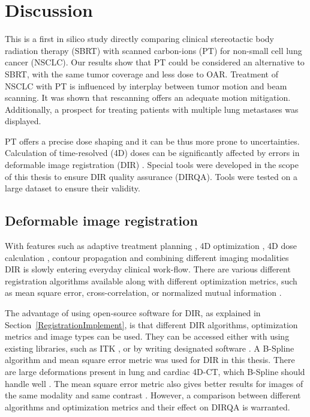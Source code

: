 \documentclass[type=dr, dr=rernat, accentcolor=tud7b,colorbacktitle, bigchapter, openright, twoside, 12pt ]{tudthesis}
\begin{document}
\chapter{Discussion}

This is a first in silico study directly comparing clinical stereotactic body radiation therapy (SBRT) with scanned carbon-ions (PT) for non-small cell lung cancer (NSCLC). 
Our results show that PT could be considered an alternative to SBRT, with the same tumor coverage and less dose to OAR. Treatment of NSCLC with PT is influenced by 
interplay between tumor motion and beam scanning. It was shown that rescanning offers an
adequate motion mitigation. Additionally, a prospect for treating patients with multiple lung metastases was displayed.

PT offers a precise dose shaping and it can be thus more prone to uncertainties. Calculation of time-resolved (4D) doses can be significantly
affected by errors in deformable image registration (DIR) \cite{Heath2006}. Special tools were developed in the scope of this thesis to ensure DIR quality assurance (DIRQA).
Tools were tested on a large dataset to ensure their validity.


\section{Deformable image registration}

With features such as adaptive treatment planning \cite{Yan1997}, 4D optimization \cite{Trofimov2005}, 4D dose calculation \cite{Flampouri2006}, 
contour propagation \cite{Lu2006b} and combining different imaging modalities \cite{Leibfarth2013} DIR is slowly entering everyday clinical work-flow. 
There are various different registration algorithms available \cite{Varadhan2013}
along with different optimization metrics, such as mean square error, cross-correlation, or normalized mutual information \cite{Glocker2011}.

The advantage of using open-source software for DIR, as explained in Section~\ref{RegistrationImplement}, is that different DIR algorithms, 
optimization metrics and image types can be used. They can be accessed either with using
existing libraries, such as ITK \cite{Yoo2002}, or by writing designated software \cite{Fedorov2015}. A B-Spline algorithm and mean square error metric was used for DIR in this thesis. 
There are large deformations present in lung and cardiac
4D-CT, which B-Spline should handle well \cite{Tang2013}. The mean square error metric also gives better results for images of the same modality and same contrast \cite{Varadhan2013}. 
However, a comparison between different algorithms and optimization metrics and their effect on DIRQA is warranted.
\end{document}
